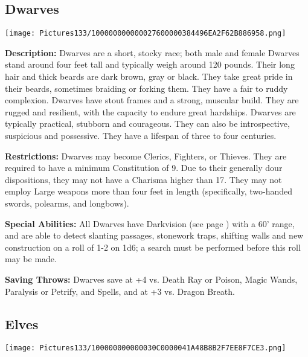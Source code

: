 \documentclass[a4paper,twoside,openany,10pt]{book}
\begin{document}
\begin{multicols}{2}
	

\subsection{Dwarves}\label{dwarves}

\begin{center}
	\texttt{[image: Pictures133/100000000000027600000384496EA2F62B886958.png]}
\end{center}

\textbf{Description: } Dwarves are a short, stocky race; both male and female Dwarves stand around four feet tall and typically weigh around 120 pounds. Their long hair and thick beards are dark brown, gray or black. They take great pride in their beards, sometimes braiding or forking them. They have a fair to ruddy complexion. Dwarves have stout frames and a strong, muscular build. They are rugged and resilient, with the capacity to endure great hardships. Dwarves are typically practical, stubborn and courageous. They can also be introspective, suspicious and possessive. They have a lifespan of three to four centuries.

\textbf{Restrictions: } Dwarves may become Clerics, Fighters, or Thieves. They are required to have a minimum Constitution of 9. Due to their generally dour dispositions, they may not have a Charisma higher than 17. They may not employ Large weapons more than four feet in length (specifically, two-handed swords, polearms, and longbows).

\textbf{Special Abilities:} All Dwarves have Darkvision (see page \hyperlink{darkvision}{\pageref{darkvision}}) with a 60'{} range, and are able to detect slanting passages, stonework traps, shifting walls and new construction on a roll of 1-2 on 1d6; a search must be performed before this roll may be made.

\textbf{Saving Throws: } Dwarves save at +4 vs. Death Ray or Poison, Magic Wands, Paralysis or Petrify, and Spells, and at +3 vs. Dragon Breath.

\columnbreak

\subsection{Elves}\label{elves}

\begin{center}
	\texttt{[image: Pictures133/100000000000030C0000041A48B8B2F7EE8F7CE3.png]}
\end{center}


\end{multicols}
\end{document}

